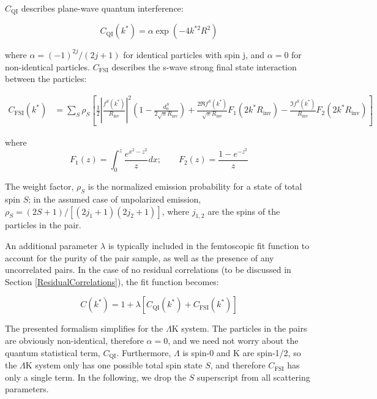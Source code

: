 \documentclass[ALICE,manyauthors]{cernphprep}
\newcommand{\Lam}{$\Lambda$\xspace}
\newcommand{\LamK}{$\Lambda$K\xspace}
\begin{document}
$C_{\mathrm{QI}}$ describes plane-wave quantum interference:

\begin{equation}
 C_{\mathrm{QI}}(k^{*}) = \alpha\exp(-4k^{*2}R^{2})
\label{eqn:CQI}
\end{equation}

where $\alpha = (-1)^{2j}/(2j+1)$ for identical particles with spin j, and $\alpha = 0$ for non-identical particles.   
$C_{\mathrm{FSI}}$ describes the s-wave strong final state interaction between the particles:



\begin{equation}
\begin{aligned}
C_{\mathrm{FSI}}(k^{*}) &= \sum_{S}\rho_{S}\left[\frac{1}{2}\left|\frac{f^{S}(k^{*})}{R_{\mathrm{inv}}}\right|^2\left(1-\frac{d^{S}_{0}}{2\sqrt{\pi}R_{\mathrm{inv}}}\right)+\frac{2\Re f^{S}(k^{*})}{\sqrt{\pi}R_{\mathrm{inv}}}F_{1}(2k^{*}R_{\mathrm{inv}})-\frac{\Im f^{S}(k^{*})}{R_{\mathrm{inv}}}F_{2}(2k^{*}R_{\mathrm{inv}})\right]
\end{aligned}  
\label{eqn:CFSI}
\end{equation}

where 
\begin{equation}
F_{1}(z) = \int_{0}^{z} \frac{e^{x^{2}-z^{2}}}{z}dx; \qquad
F_{2}(z) = \frac{1-e^{-z^{2}}}{z}
\label{eqn:CFSI2}
\end{equation}

The weight factor, $\rho_{S}$ is the normalized emission probability for a state of total spin $S$; in the assumed case of unpolarized emission, $\rho_{S} = (2S+1)/[(2j_{1}+1)(2j_{2}+1)]$, where $j_{1,2}$ are the spins of the particles in the pair.

An additional parameter $\lambda$ is typically included in the femtoscopic fit function to account for the purity of the pair sample, as well as the presence of any uncorrelated pairs.  
In the case of no residual correlations (to be discussed in Section \ref{ResidualCorrelations}), the fit function becomes:

\begin{equation}
 C(k^{*}) = 1 + \lambda[C_{\mathrm{QI}}(k^{*}) + C_{\mathrm{FSI}}(k^{*})]
\label{eqn:LednickyEqnwLambda}
\end{equation}

The presented formalism simplifies for the \LamK system.
The particles in the pairs are obviously non-identical, therefore $\alpha=0$, and we need not worry about the quantum statistical term, $C_{\mathrm{QI}}$.
Furthermore, \Lam is spin-0 and K are spin-1/2, so the \LamK system only has one possible total spin state $S$, and therefore $C_{\mathrm{FSI}}$ has only a single term.
In the following, we drop the $S$ superscript from all scattering parameters.
\end{document}
